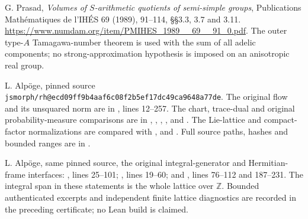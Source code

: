 G. Prasad, \emph{Volumes of $S$-arithmetic quotients of semi-simple
groups}, Publications Math\'ematiques de l'IH\'ES 69 (1989), 91--114,
\S\S3.3, 3.7 and 3.11.
\url{https://www.numdam.org/item/PMIHES_1989__69__91_0.pdf}.
The outer type-$A$ Tamagawa-number theorem is used with the sum of
all adelic components; no strong-approximation hypothesis is imposed
on an anisotropic real group.

L. Alp\"oge, pinned source
\texttt{jsmorph/rh@ecd09ff9b4aaf6c08f2b5ef17dc49ca9648a77de}.
The original flow and its unsquared norm are in
, lines 12--257.
The chart, trace-dual and original probability-measure comparisons
are in ,
,
,
,
 and .
The Lie-lattice and compact-factor normalizations are compared with
,  and
.
Full source paths, hashes and bounded ranges are in
.

L. Alp\"oge, same pinned source, the original integral-generator
and Hermitian-frame interfaces:
,
lines 25--101; ,
lines 19--60; and ,
lines 76--112 and 187--231.
The integral span in these statements is the whole lattice over
$\mathbb Z$.  Bounded authenticated excerpts and independent
finite lattice diagnostics are recorded in the preceding certificate;
no Lean build is claimed.
